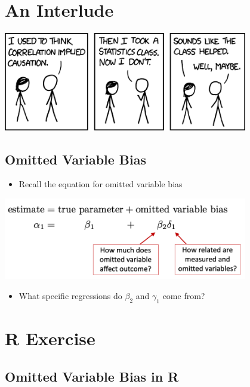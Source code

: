 \documentclass[
  letterpaper,
  DIV=11,
  numbers=noendperiod]{scrreprt}
\providecommand{\tightlist}{%
  \setlength{\itemsep}{0pt}\setlength{\parskip}{0pt}}\usepackage{longtable,booktabs,array}
\begin{document}
\section{An Interlude}\label{an-interlude}

\includegraphics[width=0.8\textwidth,height=\textheight]{./images/correlation.png}

\subsection{Omitted Variable Bias}\label{omitted-variable-bias}

\begin{itemize}
\tightlist
\item
  Recall the equation for omitted variable bias
\end{itemize}

\includegraphics[width=0.8\textwidth,height=\textheight]{images/ovb.png}

\begin{itemize}
\tightlist
\item
  What specific regressions do \(\beta_2\) and \(\gamma_1\) come from?
\end{itemize}

\section{R Exercise}\label{r-exercise-2}

\subsection{Omitted Variable Bias in
R}\label{omitted-variable-bias-in-r}
\end{document}
